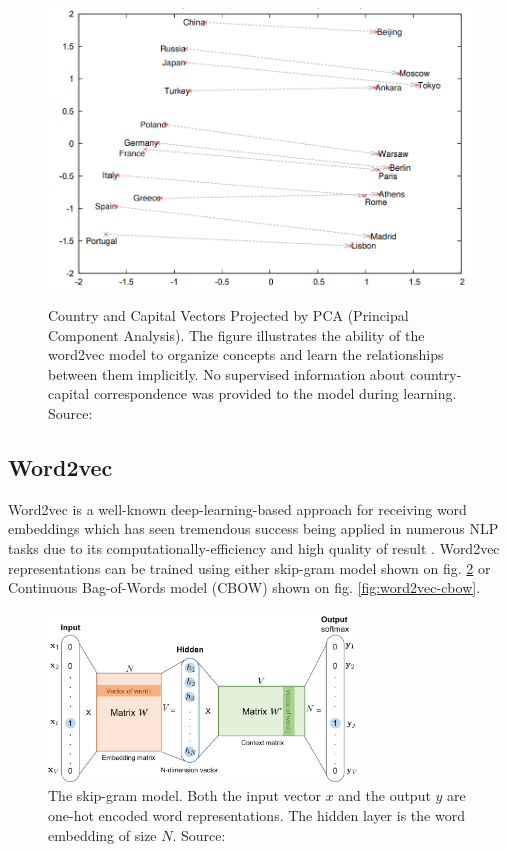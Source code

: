 \begin{figure}[h]
    \centering
    \includegraphics[height=8cm]{Images/word2vec-property.png}
    \caption{Country and Capital Vectors Projected by PCA (Principal Component Analysis). The figure illustrates the ability of the word2vec model to organize concepts and learn the relationships between them implicitly. No supervised information about country-capital correspondence was provided to the model during learning. Source: \citep{Mikolov-NIPS2013}}
    \label{fig:word2vec-property}
\end{figure} 


\subsection{Word2vec} 
\label{sec:word2vec}
Word2vec is a well-known deep-learning-based approach for receiving word embeddings which has seen tremendous success being applied in numerous NLP tasks due to its computationally-efficiency and high quality of result \cite{Mikolov-NIPS2013}. Word2vec representations can be trained using either skip-gram model \citep{Mikolov-NIPS2013} shown on fig. \ref{fig:word2vec-skip-gram}  or Continuous Bag-of-Words model (CBOW) \citep{Mikolov-ICLR2013} shown on fig. \ref{fig:word2vec-cbow}.

\begin{figure}[h]
    \centering
    \includegraphics[height=4.5cm]{Images/word2vec-skip-gram.png}
    \caption{The skip-gram model. Both the input vector $x$ and the output $y$ are one-hot encoded word representations. The hidden layer is the word embedding of size $N$. Source: \citep{Weng-2017}}
    \label{fig:word2vec-skip-gram}
\end{figure} 

